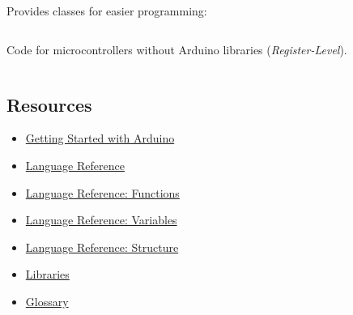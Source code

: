 \documentclass[aspectratio=169]{beamer}
\begin{document}
\begin{frame}
    \par Provides classes for easier programming:
    \begin{columns}
        \begin{column}{0.5\textwidth}
            \begin{listing}[H]
                \caption{Code for microcontrollers without Arduino\textregistered{} libraries (\textit{Register-Level}).}
                \label{lst:arduino:example:rtl}
            \end{listing}
        \end{column}
        \begin{column}{0.5\textwidth}
        \end{column}
    \end{columns}
\end{frame}

\subsection{Resources}
\begin{frame}
    \begin{itemize}
        \item \href{https://docs.arduino.cc/learn/starting-guide/getting-started-arduino}{Getting Started with Arduino}
        \item \href{https://www.arduino.cc/reference/en/}{Language Reference}
        \item \href{https://www.arduino.cc/reference/en/\#functions}{Language Reference: Functions}
        \item \href{https://www.arduino.cc/reference/en/\#variables}{Language Reference: Variables}
        \item \href{https://www.arduino.cc/reference/en/\#structure}{Language Reference: Structure}
        \item \href{https://www.arduino.cc/reference/en/libraries/}{Libraries}
        \item \href{https://www.arduino.cc/glossary/en/}{Glossary}
    \end{itemize}
\end{frame}
\end{document}
